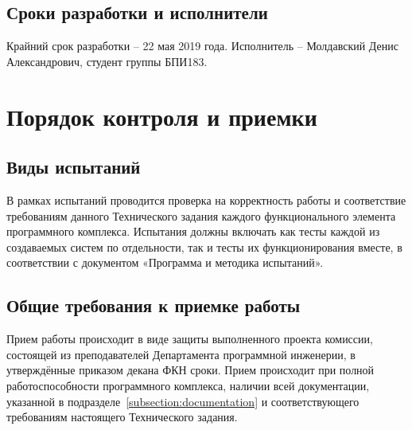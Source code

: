﻿\documentclass[techtask]{espd}
\begin{document}
\subsection{Сроки разработки и исполнители}
Крайний срок разработки – 22 мая 2019 года. Исполнитель – Молдавский Денис Александрович, студент группы БПИ183.

\section{Порядок контроля и приемки}

\subsection{Виды испытаний}
В рамках испытаний проводится проверка на корректность работы и соответствие требованиям данного Технического задания каждого функционального элемента программного комплекса. Испытания должны включать как тесты каждой из создаваемых систем по отдельности, так и тесты их функционирования вместе, в соответствии с документом «Программа и методика испытаний».

\subsection{Общие требования к приемке работы}
Прием работы происходит в виде защиты выполненного проекта комиссии, состоящей из преподавателей Департамента программной инженерии, в утверждённые приказом декана ФКН сроки. Прием происходит при полной работоспособности программного комплекса, наличии всей документации, указанной в подразделе~\ref{subsection:documentation} и соответствующего требованиям настоящего Технического задания.


\end{document}
